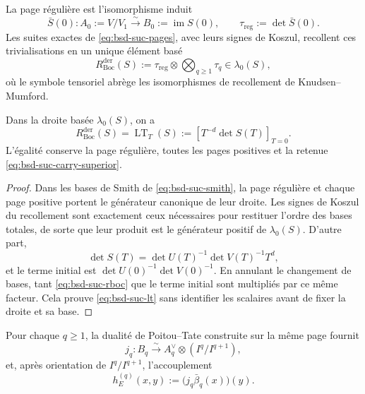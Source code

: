 La page régulière est l'isomorphisme induit
\begin{equation}\label{eq:bsd-suc-pagina-regular}
 \bar S(0):A_0:=V/V_1
 \xrightarrow{\ \sim\ }
 B_0:=\operatorname{im}S(0),
 \qquad
 \tau_{\mathrm{reg}}:=\det\bar S(0).
\end{equation}
Les suites exactes de \eqref{eq:bsd-suc-pages}, avec leurs signes de
Koszul, recollent ces trivialisations en un unique élément basé
\begin{equation}\label{eq:bsd-suc-rboc}
 R_{\mathrm{Boc}}^{\mathrm{der}}(S)
 :=\tau_{\mathrm{reg}}\otimes
   \bigotimes_{q\geq1}\tau_q
 \in\lambda_0(S),
\end{equation}
où le symbole tensoriel abrège les isomorphismes de recollement de
Knudsen--Mumford.

\begin{theorem}
\label{thm:bsd-suc-bockstein}
Dans la droite basée \(\lambda_0(S)\), on a
\begin{equation}\label{eq:bsd-suc-lt}
 R_{\mathrm{Boc}}^{\mathrm{der}}(S)
 =\operatorname{LT}_{T}(S)
 :=\left[T^{-d}\det S(T)\right]_{T=0}.
\end{equation}
L'égalité conserve la page régulière, toutes les pages positives et la
retenue \eqref{eq:bsd-suc-carry-superior}.
\end{theorem}

\begin{proof}
Dans les bases de Smith de \eqref{eq:bsd-suc-smith}, la page régulière et chaque
page positive portent le générateur canonique de leur droite. Les signes de
Koszul du recollement sont exactement ceux nécessaires pour restituer l'ordre des
bases totales, de sorte que leur produit est le générateur positif de
\(\lambda_0(S)\). D'autre part,
\[
 \det S(T)=\det U(T)^{-1}\det V(T)^{-1}T^d,
\]
et le terme initial est
\(\det U(0)^{-1}\det V(0)^{-1}\). En annulant le changement de bases, tant
\eqref{eq:bsd-suc-rboc} que le terme initial sont multipliés par ce même
facteur. Cela prouve \eqref{eq:bsd-suc-lt} sans identifier les scalaires avant de
fixer la droite et sa base.
\end{proof}

Pour chaque \(q\geq1\), la dualité de Poitou--Tate construite sur la même
page fournit
\begin{equation}\label{eq:bsd-suc-jq}
 j_q:B_q\xrightarrow{\ \sim\ }
 A_q^{\vee}\otimes(I^q/I^{q+1}),
\end{equation}
et, après orientation de \(I^q/I^{q+1}\), l'accouplement
\begin{equation}\label{eq:bsd-suc-altura-derivada}
 h_E^{(q)}(x,y)
 :=\bigl(j_q\bar\beta_q(x)\bigr)(y).
\end{equation}

